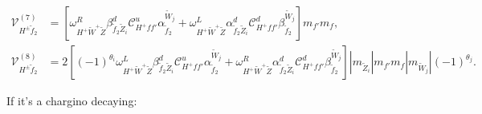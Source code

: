 \documentclass[final,3p,times,pdflatex]{elsarticle}
\begin{document}
\begin{align}
\mathcal{V}_{H^{\pm} \tilde{f}_2}^{(7)} &= [\omega_{H^+ \tilde{W}^+ \tilde{Z}}^R \beta_{\tilde{f}_2 \tilde{Z}_i}^{d} \mathcal{C}_{H^+ f f'}^u \alpha_{\tilde{f}_2}^{\tilde{W}_j} + \omega_{H^+ \tilde{W}^+ \tilde{Z}}^L \alpha_{\tilde{f}_2 \tilde{Z}_i}^{d} \mathcal{C}_{H^+ f f'}^d \beta_{\tilde{f}_2}^{\tilde{W}_j}]m_{f'}m_{f}, \\
\mathcal{V}_{H^{\pm} \tilde{f}_2}^{(8)} &= 2[(-1)^{\theta_i}\omega_{H^+ \tilde{W}^+ \tilde{Z}}^L  \beta_{\tilde{f}_2 \tilde{Z}_i}^{d} \mathcal{C}_{H^+ f f'}^u \alpha_{\tilde{f}_2}^{\tilde{W}_j} +  \omega_{H^+ \tilde{W}^+ \tilde{Z}}^R \alpha_{\tilde{f}_2 \tilde{Z}_i}^{d} \mathcal{C}_{H^+ f f'}^d \beta_{\tilde{f}_2}^{\tilde{W}_j}]|m_{\tilde{Z}_i}|m_{f'}m_{f}|m_{\tilde{W}_j}|(-1)^{\theta_j}.
\end{align}

If it's a chargino decaying:
\end{document}
